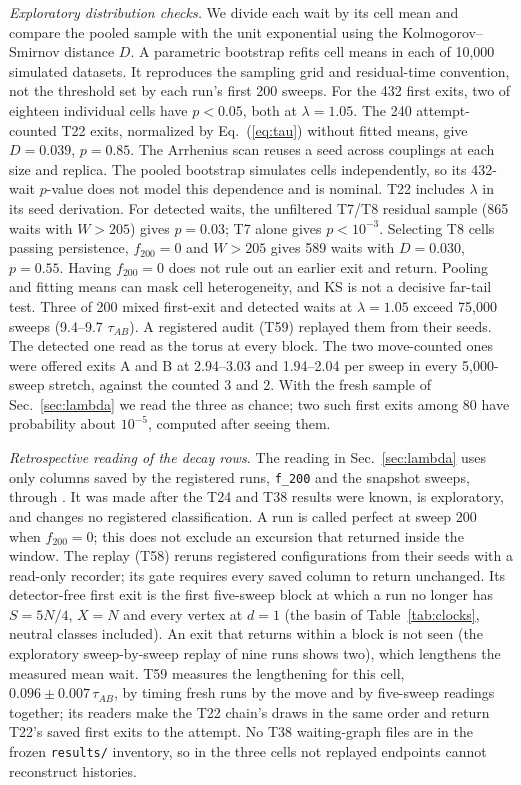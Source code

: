 \documentclass[aps,pre,10pt,twocolumn,superscriptaddress,nofootinbib]{revtex4-2}
\begin{document}
\emph{Exploratory distribution checks.} We divide each wait by its cell mean
and compare the pooled sample with the unit exponential using the Kolmogorov--Smirnov distance $D$.
A parametric bootstrap refits cell means in each of 10,000 simulated datasets. It reproduces the
sampling grid and residual-time convention, not the threshold set by each run's first 200 sweeps.
For the 432 first exits, two of eighteen individual cells have $p<0.05$, both at $\lambda=1.05$. The 240 attempt-counted T22 exits, normalized by Eq.~(\ref{eq:tau}) without fitted
means, give $D=0.039$, $p=0.85$. The Arrhenius scan reuses a seed across couplings at each
size and replica. The pooled bootstrap simulates cells independently, so its 432-wait $p$-value
does not model this dependence and is nominal. T22 includes $\lambda$ in its seed derivation.
For detected waits, the unfiltered T7/T8 residual sample (865 waits with $W>205$) gives $p=0.03$;
T7 alone gives $p<10^{-3}$. Selecting T8 cells passing persistence, $f_{200}=0$ and $W>205$ gives
589 waits with $D=0.030$, $p=0.55$. Having $f_{200}=0$ does not rule out an earlier exit and return.
Pooling and fitting means can mask cell
heterogeneity, and KS is not a decisive far-tail test.
Three of 200 mixed first-exit and detected waits at $\lambda=1.05$ exceed 75,000 sweeps
(9.4--9.7 $\tau_{AB}$). A registered audit (T59) replayed them from their seeds. The detected one
read as the torus at every block. The two move-counted ones were offered exits A and B at 2.94--3.03
and 1.94--2.04 per sweep in every 5,000-sweep stretch, against the counted 3 and 2. With the fresh
sample of Sec.~\ref{sec:lambda} we read the three as chance; two such first exits among 80 have
probability about $10^{-5}$, computed after seeing them.

\emph{Retrospective reading of the decay rows.} The reading in Sec.~\ref{sec:lambda} uses only
columns saved by the registered runs, \texttt{f\_200} and the snapshot sweeps, through
. It was made after the T24 and T38 results were known, is
exploratory, and changes no registered classification. A run is called perfect at sweep 200 when
$f_{200}=0$; this does not exclude an excursion that returned inside the window. The replay (T58)
reruns registered configurations from their seeds with a read-only recorder; its gate requires every
saved column to return unchanged. Its detector-free first exit is the first five-sweep block at which
a run no longer has $S=5N/4$, $X=N$ and every vertex at $d=1$ (the basin of Table~\ref{tab:clocks},
neutral classes included). An exit that returns within a block is not seen (the exploratory
sweep-by-sweep replay of nine runs shows two), which lengthens the measured mean wait. T59 measures
the lengthening for this cell, $0.096\pm0.007\,\tau_{AB}$, by timing fresh runs by the move and by
five-sweep readings together; its readers make the T22 chain's draws in the same order and return
T22's saved first exits to the attempt. No T38 waiting-graph files are in the frozen
\texttt{results/} inventory, so in the three cells not replayed endpoints cannot reconstruct
histories.
\end{document}
